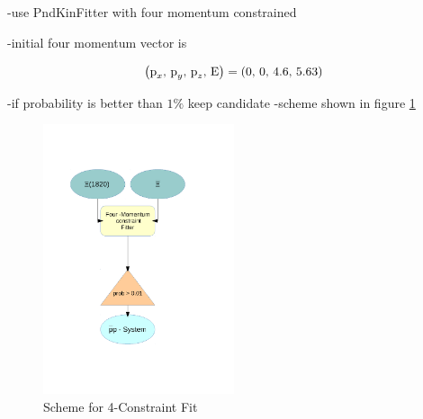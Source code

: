 	-use PndKinFitter with four momentum constrained
	
	-initial four momentum vector is 
	\begin{center}
		\begin{equation}\nonumber
			\left(\textnormal{p}_x,\, \textnormal{p}_y,\, \textnormal{p}_z,\, \textnormal{E} \right) = \left(0,\, 0,\, 4.6,\, 5.63 \right)
		\end{equation}
	\end{center}
	
	
	-if probability is better than $1\%$ keep candidate
	-scheme shown in figure \ref{fig:fourconstraintfit}
	
	\begin{figure}
		\centering
			\includegraphics[width=0.50\textwidth]{./plots/combineCascadeSys.pdf}
		\caption{Scheme for 4-Constraint Fit}
		\label{fig:fourconstraintfit}
	\end{figure}